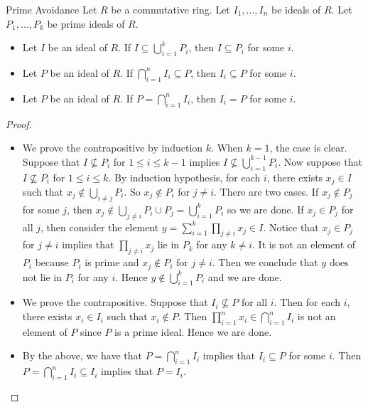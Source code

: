\documentclass[a4paper]{article}
\begin{document}
\begin{prp}{Prime Avoidance}{} Let $R$ be a commutative ring. Let $I_1,\dots,I_n$ be ideals of $R$. Let $P_1,\dots,P_k$ be prime ideals of $R$. 
\begin{itemize}
\item Let $I$ be an ideal of $R$. If $I\subseteq\bigcup_{i=1}^kP_i$, then $I\subseteq P_i$ for some $i$. 
\item Let $P$ be an ideal of $R$. If $\bigcap_{i=1}^nI_i\subseteq P$, then $I_i\subseteq P$ for some $i$. 
\item Let $P$ be an ideal of $R$. If $P=\bigcap_{i=1}^nI_i$, then $I_i=P$ for some $i$. 
\end{itemize} \tcbline
\begin{proof}~\\
\begin{itemize}
\item We prove the contrapositive by induction $k$. When $k=1$, the case is clear. Suppose that $I\not\subseteq P_i$ for $1\leq i\leq k-1$ implies $I\not\subseteq\bigcup_{i=1}^{k-1}P_i$. Now suppose that $I\not\subseteq P_i$ for $1\leq i\leq k$. By induction hypothesis, for each $i$, there exists $x_j\in I$ such that $x_j\notin\bigcup_{i\neq j}P_i$. So $x_j\notin P_i$ for $j\neq i$. There are two cases. If $x_j\notin P_j$ for some $j$, then $x_j\notin\bigcup_{j\neq i}P_i\cup P_j=\bigcup_{i=1}^kP_i$ so we are done. If $x_j\in P_j$ for all $j$, then consider the element $y=\sum_{i=1}^k\prod_{j\neq i}x_j\in I$. Notice that $x_j\in P_j$ for $j\neq i$ implies that $\prod_{j\neq i}x_j$ lie in $P_k$ for any $k\neq i$. It is not an element of $P_i$ because $P_i$ is prime and $x_j\notin P_i$ for $j\neq i$. Then we conclude that $y$ does not lie in $P_i$ for any $i$. Hence $y\notin\bigcup_{i=1}^kP_i$ and we are done. 
\item We prove the contrapositive. Suppose that $I_i\not\subseteq P$ for all $i$. Then for each $i$, there exists $x_i\in I_i$ such that $x_i\notin P$. Then $\prod_{i=1}^nx_i\in\bigcap_{i=1}^nI_i$ is not an element of $P$ since $P$ is a prime ideal. Hence we are done. 
\item By the above, we have that $P=\bigcap_{i=1}^nI_i$ implies that $I_i\subseteq P$ for some $i$. Then $P=\bigcap_{i=1}^nI_i\subseteq I_i$ implies that $P=I_i$. 
\end{itemize}
\end{proof}
\end{prp}
\end{document}
